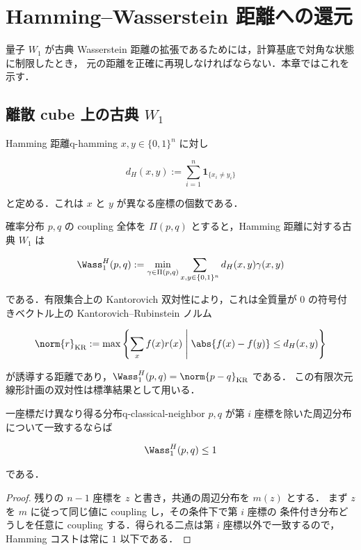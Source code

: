 \chapter{Hamming--Wasserstein 距離への還元}
\label{ch:classical-reduction}

量子 $W_1$ が古典 Wasserstein 距離の拡張であるためには，計算基底で対角な状態に制限したとき，
元の距離を正確に再現しなければならない．本章ではこれを示す．

\section{離散 cube 上の古典 \texorpdfstring{$W_1$}{W1}}

\begin{definition}{Hamming 距離}{q-hamming}
  $x,y\in\{0,1\}^n$ に対し

  \[
    d_H(x,y):=\sum_{i=1}^n\mathbf{1}_{\{x_i\neq y_i\}}
  \]

  と定める．これは $x$ と $y$ が異なる座標の個数である．
\end{definition}

確率分布 $p,q$ の coupling 全体を $\Pi(p,q)$ とすると，Hamming 距離に対する古典 $W_1$ は

\[
  \Wass_1^H(p,q)
  :=\min_{\gamma\in\Pi(p,q)}
  \sum_{x,y\in\{0,1\}^n}d_H(x,y)\gamma(x,y)
\]

である．有限集合上の Kantorovich 双対性により，これは全質量が $0$ の符号付きベクトル上の
Kantorovich--Rubinstein ノルム

\[
  \norm{r}_{\rm KR}
  :=\max\left\{
    \sum_xf(x)r(x)
    \;\middle|\;
    \abs{f(x)-f(y)}\leq d_H(x,y)
  \right\}
\]

が誘導する距離であり，$\Wass_1^H(p,q)=\norm{p-q}_{\rm KR}$ である．
この有限次元線形計画の双対性は標準結果として用いる．

\begin{lemma}{一座標だけ異なり得る分布}{q-classical-neighbor}
  $p,q$ が第 $i$ 座標を除いた周辺分布について一致するならば

  \[
    \Wass_1^H(p,q)\leq1
  \]

  である．
\end{lemma}

\begin{proof}
  残りの $n-1$ 座標を $z$ と書き，共通の周辺分布を $m(z)$ とする．
  まず $z$ を $m$ に従って同じ値に coupling し，その条件下で第 $i$ 座標の
  条件付き分布どうしを任意に coupling する．得られる二点は第 $i$ 座標以外で一致するので，
  Hamming コストは常に $1$ 以下である．
\end{proof}

